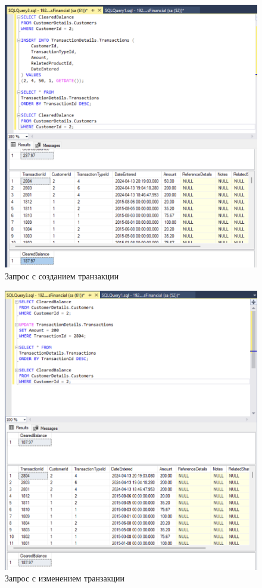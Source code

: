 \documentclass[a4paper, 14pt]{extarticle}
\begin{document}
\begin{figure}[H]
  \centering
  \includegraphics[width=\textwidth]{images/task-4/2.png}
  \caption{Запрос с созданием транзакции}
  \label{fig:task-4-2}
\end{figure}

\begin{figure}[H]
  \centering
  \includegraphics[width=\textwidth]{images/task-4/3.png}
  \caption{Запрос с изменением транзакции}
  \label{fig:task-4-3}
\end{figure}
\end{document}
